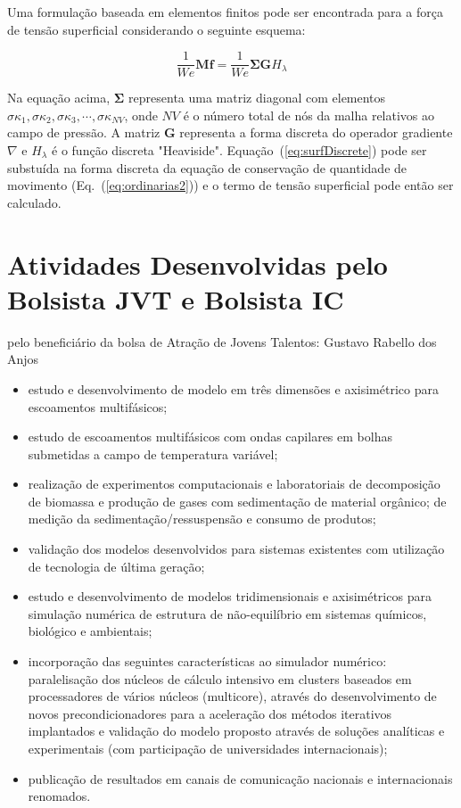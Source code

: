 \documentclass[a4paper,portuges]{article}
\newcommand{\fvet}{\mathbf{f}}
\begin{document}
Uma formulação baseada em elementos finitos pode ser encontrada para a
força de tensão superficial considerando o seguinte esquema: 

\begin{equation}
	\frac{1}{We}\mathbf{M} \fvet 
	= 
	\frac{1}{We} \mathbf{\Sigma} \mathbf{G} H_{\lambda}
	\label{eq:surfDiscrete}
\end{equation}

Na equação acima, $\mathbf{\Sigma}$ representa uma matriz diagonal com
elementos $\sigma \kappa_1, \sigma \kappa_2, \sigma \kappa_3,\cdots,
\sigma \kappa_{NV}$, onde $NV$ é o número total de nós da malha
relativos ao campo de pressão. A matriz $\mathbf{G}$ representa a forma
discreta do operador gradiente $\nabla$ e $H_{\lambda}$ é o função
discreta "Heaviside". Equação~(\ref{eq:surfDiscrete})
pode ser substuída na forma discreta da equação de conservação de
quantidade de movimento (Eq.~(\ref{eq:ordinarias2})) e o termo de tensão
superficial pode então ser calculado. 

\section{Atividades Desenvolvidas pelo Bolsista JVT e Bolsista IC}

pelo beneficiário da bolsa de Atração de Jovens Talentos: Gustavo Rabello
dos Anjos
\begin{itemize}
\item estudo e desenvolvimento de modelo em três dimensões e axisimétrico
para escoamentos multifásicos;
\item estudo de escoamentos multifásicos com ondas capilares em bolhas
submetidas a campo de temperatura variável;
\item realização de experimentos computacionais e laboratoriais de
decomposição de biomassa e produção de gases com sedimentação de
material orgânico; de medição da sedimentação/ressuspensão e consumo de
produtos;
\item validação dos modelos desenvolvidos para sistemas existentes com
utilização de tecnologia de última geração;
\item estudo e desenvolvimento de modelos tridimensionais e axisimétricos
para simulação numérica de estrutura de não-equilíbrio em sistemas
químicos, biológico e ambientais;
\item incorporação das seguintes características ao simulador numérico:
paralelisação dos núcleos de cálculo intensivo em clusters baseados em
processadores de vários núcleos (multicore), através do desenvolvimento
de novos precondicionadores para a aceleração dos métodos iterativos
implantados e validação do modelo proposto através de soluções
analíticas e experimentais (com participação de universidades
internacionais);
\item publicação de resultados em canais de comunicação nacionais e
internacionais renomados.
\end{itemize}
\end{document}
